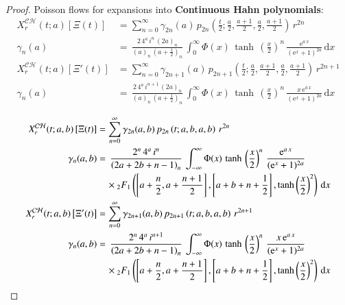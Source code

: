 \documentclass[a4paper,11pt,twoside]{amsart}
\newcommand{\verifiedeq}{=}
\newcommand{\verifiedeq}{\stackrel{\checkmark}{=}}
\begin{document}
\begin{proof}
Poisson flows for expansions into \textbf{Continuous Hahn polynomials}:
\begin{align}
 X^\mathcal{CH}_r(t;a)\left[\Xi(t)\right] &\verifiedeq \sum_{n=0}^\infty \gamma_{2n}(a)\,p_{2n}\left(\frac{t}{2};\frac{a}{2},\frac{a+1}{2},\frac{a}{2},\frac{a+1}{2}\right)\, r^{2n} \\
\gamma_n(a) &\verifiedeq \,\frac{2\,4^a\,i^n \,(2a)_n}{(a)_n\,\left(a+\frac12\right)_n} \,\int_{0}^{\infty} \Phi(x)\,\tanh\,\left(\frac{x}{2}\right)^n\,\frac{\textrm{e}^{a\,x}}{(\textrm{e}^{x}+1)^{2a}}\,\mathrm{d}x\\
 X^\mathcal{CH}_r(t;a)\left[\Xi'(t)\right] &\verifiedeq \sum_{n=0}^\infty \gamma_{2n+1}(a)\,p_{2n+1}\left(\frac{t}{2};\frac{a}{2},\frac{a+1}{2},\frac{a}{2},\frac{a+1}{2}\right)\, r^{2n+1} \\
\gamma_n(a) &\verifiedeq \,\frac{2\,4^a\,i^{n+1} \,(2a)_n}{(a)_n\,\left(a+\frac12\right)_n} \,\int_{0}^{\infty} \Phi(x)\,\tanh\,\left(\frac{x}{2}\right)^n\,\frac{x\,\textrm{e}^{a\,x}}{(\textrm{e}^{x}+1)^{2a}}\,\mathrm{d}x
\end{align} 

\begin{align}
 X^\mathcal{CH}_r(t;a,b)\left[\Xi(t)\right] &\verifiedeq \sum_{n=0}^\infty \gamma_{2n}(a,b)\,p_{2n}\left(t;a,b,a,b\right)\, r^{2n} \\
\gamma_n(a,b) &\verifiedeq \,\frac{2^{n}\,4^a\,i^n}{\left(2a+2b+n-1\right)_n} \,\int_{-\infty}^{\infty} \Phi(x)\,\tanh\,\left(\frac{x}{2}\right)^n\,\frac{\textrm{e}^{a\,x}}{(\textrm{e}^{x}+1)^{2a}}\\ &\quad \times{}_2F_1\left(\left[a+\frac{n}{2}, a+\frac{n+1}{2}\right],\left[a+b+n+\frac12\right],\tanh\left(\frac{x}{2}\right)^2\right)\,\mathrm{d}x \notag\\
 X^\mathcal{CH}_r(t;a,b)\left[\Xi'(t)\right] &\verifiedeq \sum_{n=0}^\infty \gamma_{2n+1}(a,b)\,p_{2n+1}\left(t;a,b,a,b\right)\, r^{2n+1} \\
\gamma_n(a,b) &\verifiedeq \,\frac{2^{n}\,4^a\,i^{n+1}}{\left(2a+2b+n-1\right)_n} \,\int_{-\infty}^{\infty} \Phi(x)\,\tanh\,\left(\frac{x}{2}\right)^n\,\frac{x\,\textrm{e}^{a\,x}}{(\textrm{e}^{x}+1)^{2a}}\\ &\quad \times{}_2F_1\left(\left[a+\frac{n}{2}, a+\frac{n+1}{2}\right],\left[a+b+n+\frac12\right],\tanh\left(\frac{x}{2}\right)^2\right)\,\mathrm{d}x \notag
\end{align} 


\end{proof}
\end{document}
